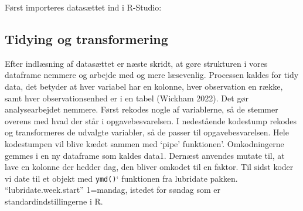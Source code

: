 \documentclass[
  12pt,
  a4paper,
  DIV=11,
  numbers=noendperiod]{scrartcl}
\begin{document}
Først importeres datasættet ind i R-Studio:

\hypertarget{tidying-og-transformering}{%
\subsection{Tidying og transformering}\label{tidying-og-transformering}}

Efter indlæsning af datasættet er næste skridt, at gøre strukturen i
vores dataframe nemmere og arbejde med og mere læsevenlig. Processen
kaldes for tidy data, det betyder at hver variabel har en kolonne, hver
observation en række, samt hver observationsenhed er i en tabel (Wickham
2022). Det gør analysearbejdet nemmere. Først rekodes nogle af
variablerne, så de stemmer overens med hvad der står i
opgavebesvarelsen. I nedestående kodestump rekodes og transformeres de
udvalgte variabler, så de passer til opgavebesvarelsen. Hele kodestumpen
vil blive kædet sammen med `pipe' funktionen'. Omkodningerne gemmes i en
ny dataframe som kaldes data1. Dernæst anvendes mutate til, at lave en
kolonne der hedder dag, den bliver omkodet til en faktor. Til sidst
koder vi date til et objekt med \texttt{ymd()}` funktionen fra lubridate
pakken. ``lubridate.week.start'' 1=mandag, istedet for søndag som er
standardindstillingerne i R.
\end{document}
